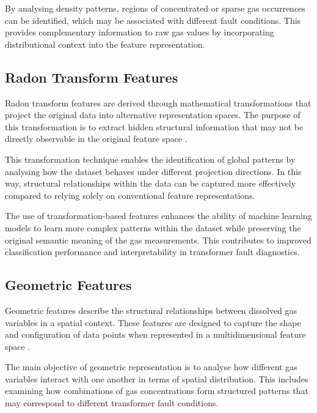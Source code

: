 By analysing density patterns, regions of concentrated or sparse gas occurrences can be identified, which may be associated with different fault conditions. This provides complementary information to raw gas values by incorporating distributional context into the feature representation.

\subsection{Radon Transform Features}

Radon transform features are derived through mathematical transformations that project the original data into alternative representation spaces. The purpose of this transformation is to extract hidden structural information that may not be directly observable in the original feature space \parencite{Hu2025InterpretableEdge}.

This transformation technique enables the identification of global patterns by analysing how the dataset behaves under different projection directions. In this way, structural relationships within the data can be captured more effectively compared to relying solely on conventional feature representations.

The use of transformation-based features enhances the ability of machine learning models to learn more complex patterns within the dataset while preserving the original semantic meaning of the gas measurements. This contributes to improved classification performance and interpretability in transformer fault diagnostics.

\subsection{Geometric Features}

Geometric features describe the structural relationships between dissolved gas variables in a spatial context. These features are designed to capture the shape and configuration of data points when represented in a multidimensional feature space \parencite{Hu2025InterpretableEdge}.

The main objective of geometric representation is to analyse how different gas variables interact with one another in terms of spatial distribution. This includes examining how combinations of gas concentrations form structured patterns that may correspond to different transformer fault conditions.

